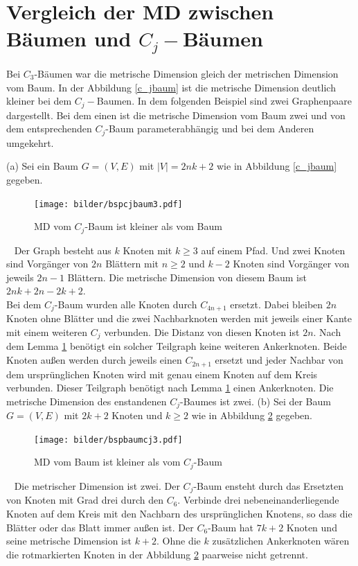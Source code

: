 \section{Vergleich der MD zwischen Bäumen und $C_j-$Bäumen}
Bei $C_3$-Bäumen war die metrische Dimension gleich der metrischen Dimension vom Baum. In der Abbildung \ref{c_jbaum} ist die metrische Dimension deutlich kleiner bei dem $C_j-$Baumen. In dem folgenden Beispiel sind zwei Graphenpaare dargestellt. Bei dem einen ist die metrische Dimension vom Baum zwei und von dem entsprechenden $C_j$-Baum parameterabhängig und bei dem Anderen umgekehrt.\\
\begin{bsp} (a) Sei ein Baum $G=(V,E)$ mit $|V|=2nk+2$ wie in Abbildung \ref{c_jbaum} gegeben.

\begin{figure}[ht]
\centering
\texttt{[image: bilder/bspcjbaum3.pdf]}
\caption{MD vom $C_j$-Baum ist kleiner als vom Baum}
\label{cjbaum}
\end{figure}
\vspace{-5mm}
~\linebreak
Der Graph besteht aus $k$ Knoten mit $k\geq 3$ auf einem Pfad. Und zwei Knoten sind Vorgänger von $2n$ Blättern mit $n\geq 2$ und $k-2$ Knoten sind Vorgänger von jeweils $2n-1$ Blättern. Die metrische Dimension von diesem Baum ist $2nk+2n-2k+2$.\\
Bei dem $C_j$-Baum wurden alle Knoten durch $C_{4n+1}$ ersetzt. Dabei bleiben $2n$ Knoten ohne Blätter und die zwei Nachbarknoten werden mit jeweils einer Kante mit einem weiteren $C_j$ verbunden. Die Distanz von diesen Knoten ist $2n$. Nach dem Lemma \ref{} benötigt ein solcher Teilgraph keine weiteren Ankerknoten. Beide Knoten außen werden durch jeweils einen $C_{2n+1}$ ersetzt und jeder Nachbar von dem ursprünglichen Knoten wird mit genau einem Knoten auf dem Kreis verbunden. Dieser Teilgraph benötigt nach Lemma \ref{} einen Ankerknoten. Die metrische Dimension des enstandenen $C_j$-Baumes ist zwei.\newline\newline
(b) Sei der Baum $G=(V,E)$ mit $2k+2$ Knoten und $k\geq 2$ wie in Abbildung \ref{baumcj} gegeben.
\begin{figure}[ht]
\centering
\texttt{[image: bilder/bspbaumcj3.pdf]}
\caption{MD vom Baum ist kleiner als vom $C_j$-Baum}
\label{baumcj}
\end{figure}
\vspace{-3mm}
~\linebreak
Die metrischer Dimension ist zwei. Der $C_j$-Baum ensteht durch das Ersetzten von Knoten mit Grad drei durch den $C_6$. Verbinde drei nebeneinanderliegende Knoten auf dem Kreis mit den Nachbarn des ursprünglichen Knotens, so dass die Blätter oder das Blatt immer außen ist. Der $C_6$-Baum hat $7k+2$ Knoten und seine metrische Dimension ist $k+2$. Ohne die $k$ zusätzlichen Ankerknoten wären die rotmarkierten Knoten in der Abbildung \ref{baumcj} paarweise nicht getrennt.
\end{bsp}
